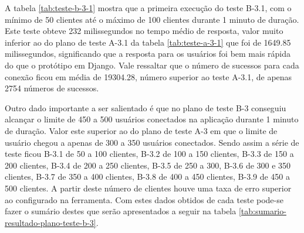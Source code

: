   A tabela \ref{tab:teste-b-3-1} mostra que a primeira execução do teste B-3.1, com o mínimo de 50 clientes até o máximo de 100 clientes
  durante 1 minuto de duração. Este teste obteve 232 milissegundos no tempo médio de resposta, valor muito inferior ao do plano de
  teste A-3.1 da tabela \ref{tab:teste-a-3-1} que foi de 1649.85 milissegundos, significando que a resposta para os usuários
  foi bem mais rápida do que o protótipo em Django. Vale ressaltar que o número de sucessos para cada conexão ficou em média de
  19304.28, número superior ao teste A-3.1, de apenas 2754 números de sucessos.

  Outro dado importante a ser salientado é que no plano de teste B-3 conseguiu alcançar o limite de 450 a 500 usuários conectados
  na aplicação durante 1 minuto de duração. Valor este superior ao do plano de teste A-3 em que o limite de usuário chegou a apenas
  de 300 a 350 usuários conectados. Sendo assim a série de teste ficou B-3.1 de 50 a 100 clientes, B-3.2 de 100 a 150 clientes,
  B-3.3 de 150 a 200 clientes, B-3.4 de 200 a 250 clientes, B-3.5 de 250 a 300, B-3.6 de 300 e 350 clientes, B-3.7 de 350 a 400 clientes,
  B-3.8 de 400 a 450 clientes, B-3.9 de 450 a 500 clientes. A partir deste número de clientes houve uma taxa de erro superior ao
  configurado na ferramenta. Com estes dados obtidos de cada teste pode-se fazer o sumário
  destes que serão apresentados a seguir na tabela \ref{tab:sumario-resultado-plano-teste-b-3}.

